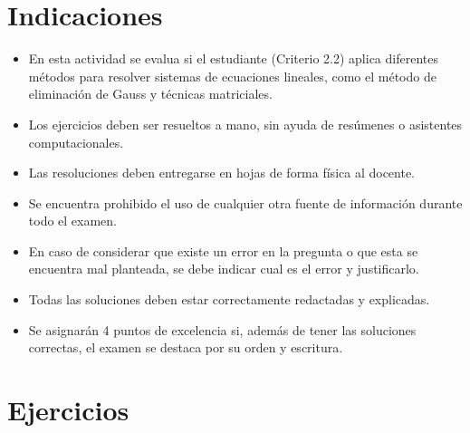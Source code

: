 \documentclass[11pt,respuestas,a4]{aleph-examen}
\begin{document}
\encabezado

\section*{Indicaciones}
\begin{itemize}[leftmargin=*]
\item
	En esta actividad se evalua si el estudiante (Criterio 2.2) aplica diferentes métodos para resolver sistemas de ecuaciones lineales, como el método de eliminación de Gauss y técnicas matriciales.
\item
    Los ejercicios deben ser resueltos a mano, sin ayuda de resúmenes o asistentes computacionales.
\item
	Las resoluciones deben entregarse en hojas de forma física al docente.
\item
	Se encuentra prohibido el uso de cualquier otra fuente de información durante todo el examen.
\item
	En caso de considerar que existe un error en la pregunta o que esta se encuentra mal planteada, se debe indicar cual es el error y justificarlo.
\item
	Todas las soluciones deben estar correctamente redactadas y explicadas.
\item
	Se asignarán 4 puntos de excelencia si, además de tener las soluciones correctas, el examen se destaca por su orden y escritura.
\end{itemize}

\section*{Ejercicios}
\end{document}
